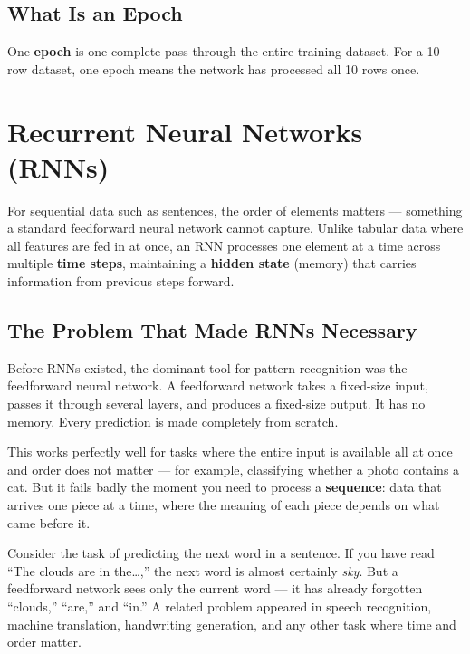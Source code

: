 \documentclass[12pt,a4paper]{article}
\begin{document}
\subsection{What Is an Epoch}

One \textbf{epoch} is one complete pass through the entire training dataset. For a
10-row dataset, one epoch means the network has processed all 10 rows once.


\section{Recurrent Neural Networks (RNNs)}

For sequential data such as sentences, the order of elements matters --- something a
standard feedforward neural network cannot capture. Unlike tabular data where all
features are fed in at once, an RNN processes one element at a time across multiple
\textbf{time steps}, maintaining a \textbf{hidden state} (memory) that carries
information from previous steps forward.

\subsection{The Problem That Made RNNs Necessary}

Before RNNs existed, the dominant tool for pattern recognition was the feedforward neural
network. A feedforward network takes a fixed-size input, passes it through several layers,
and produces a fixed-size output. It has no memory. Every prediction is made completely
from scratch.

This works perfectly well for tasks where the entire input is available all at once and
order does not matter --- for example, classifying whether a photo contains a cat. But
it fails badly the moment you need to process a \textbf{sequence}: data that arrives one
piece at a time, where the meaning of each piece depends on what came before it.

Consider the task of predicting the next word in a sentence. If you have read ``The clouds
are in the\ldots,'' the next word is almost certainly \textit{sky}. But a feedforward
network sees only the current word --- it has already forgotten ``clouds,'' ``are,'' and
``in.'' A related problem appeared in speech recognition, machine translation, handwriting
generation, and any other task where time and order matter.
\end{document}
